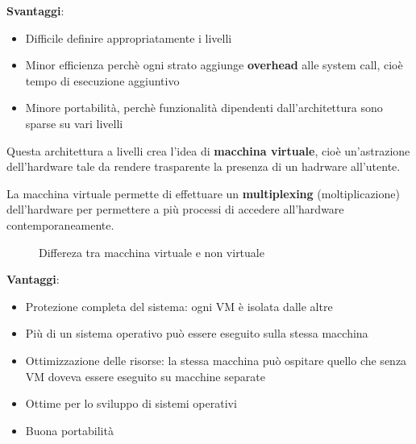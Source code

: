 \documentclass[a4paper]{article}
\begin{document}
\noindent
\textbf{Svantaggi}:
\begin{itemize}
  \item Difficile definire appropriatamente i livelli
  \item Minor efficienza perchè ogni strato aggiunge \textbf{overhead} alle system call,
    cioè tempo di esecuzione aggiuntivo
  \item Minore portabilità, perchè funzionalità dipendenti dall'architettura sono sparse
    su vari livelli
\end{itemize}

\noindent
Questa architettura a livelli crea l'idea di \textbf{macchina virtuale}, cioè
un'astrazione dell'hardware tale da rendere trasparente la presenza di un hadrware 
all'utente.

La macchina virtuale permette di effettuare un \textbf{multiplexing} (moltiplicazione) 
dell'hardware per permettere a più processi di accedere all'hardware contemporaneamente.
\begin{figure}[H]
  \centering
  \caption{Differeza tra macchina virtuale e non virtuale}
\end{figure}

\noindent
\textbf{Vantaggi}:
\begin{itemize}
  \item Protezione completa del sistema: ogni VM è isolata dalle altre
  \item Più di un sistema operativo può essere eseguito sulla stessa macchina
  \item Ottimizzazione delle risorse: la stessa macchina può ospitare quello che senza
    VM doveva essere eseguito su macchine separate
  \item Ottime per lo sviluppo di sistemi operativi
  \item Buona portabilità
\end{itemize}
\end{document}
